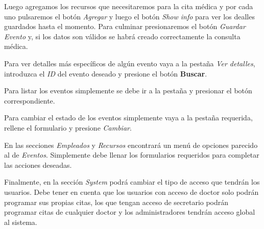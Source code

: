 \documentclass[12pt]{article}
\begin{document}
 Luego agregamos los recursos que necesitaremos para la cita médica y por cada uno pulsaremos el botón \textit{Agregar} y luego el botón \textit{Show info} para ver los dealles guardados hasta el momento. Para culminar presionaremos el botón \textit{Guardar Evento} y, si los datos son válidos se habrá creado correctamente la consulta médica.
  
 Para ver detalles más específicos de algún evento vaya a la pestaña \textit{Ver detalles}, introduzca el  \textit{ID} del evento deseado y presione el botón \textbf{Buscar}.
 
 Para listar los eventos simplemente se debe ir a la pestaña y presionar el botón correspondiente.
 
 Para cambiar el estado de los eventos simplemente vaya a la pestaña requerida, rellene el formulario y presione  \textit{Cambiar}.
 
 En las secciones \textit{Empleados} y \textit{Recursos} encontrará un menú de opciones parecido al de \textit{Eventos}. Simplemente debe llenar los formularios requeridos para completar las acciones deseadas.
 
 Finalmente, en la sección \textit{System} podrá cambiar el tipo de acceso que tendrán los usuarios. Debe tener en cuenta que los usuarios con acceso de doctor solo podrán programar sus propias citas, los que tengan acceso de secretario podrán programar citas de cualquier doctor y los administradores tendrán acceso global al sistema.
 
\end{document}
